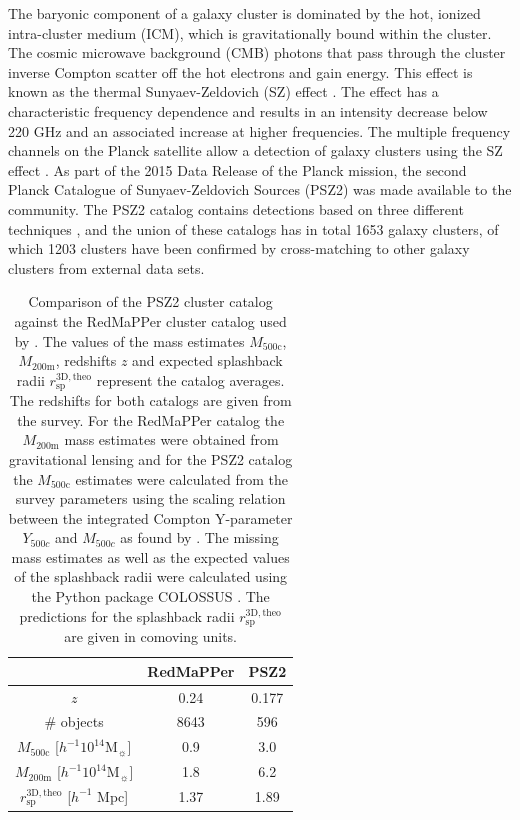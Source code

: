 \documentclass[iop, apjl, twocolappendix, numberedappendix]{emulateapj}
\begin{document}
The baryonic component of a galaxy cluster is dominated by the hot,
ionized  intra-cluster medium (ICM), which is gravitationally bound
within the cluster. The cosmic microwave background (CMB) photons
that pass through the cluster inverse Compton scatter off the hot
electrons and gain energy. This effect is known as the thermal
Sunyaev-Zeldovich (SZ) effect
\citep{sunyaev1970small,sunyaev1980velocity}. The effect has a
characteristic frequency dependence and results in an intensity
decrease below 220 GHz and an associated increase at higher
frequencies. The multiple frequency channels on the Planck satellite
allow a detection of galaxy clusters using the SZ effect
\citep{collaboration2016planck}. As part of the 2015 Data Release of
the Planck mission, the second Planck Catalogue of Sunyaev-Zeldovich
Sources (PSZ2) was made available to the community. The PSZ2 catalog
contains detections based on  three different techniques
\citep{ade2016planck}, and the union of these catalogs has in total
1653 galaxy clusters, of which 1203 clusters have been confirmed by
cross-matching to other galaxy clusters from external data sets.
\begin{table}
    \centering
    \caption{Comparison of the PSZ2 cluster catalog
    against the RedMaPPer cluster catalog used by
\citet{more2016detection}. The values of the mass estimates
$M_{\mathrm{500c}}$, $M_{\mathrm{200m}}$, redshifts $z$ and expected
splashback radii $r^{\mathrm{3D,theo}}_{\mathrm{sp}}$ represent the
catalog averages. The redshifts for both catalogs are given from the
survey. For the RedMaPPer catalog the $M_{\mathrm{200m}}$ mass
estimates were obtained from gravitational lensing and for the PSZ2
catalog the $M_{\mathrm{500c}}$ estimates were calculated from the
survey parameters using the scaling relation between the integrated
Compton Y-parameter $Y_{500c}$ and $M_{500c}$ as found by
\citet{ade2014planck}. The missing mass estimates as well as the
expected values of the splashback radii were calculated using the
Python package COLOSSUS \citep{diemer2017colossus}. The predictions
for the splashback radii $r^{\mathrm{3D,theo}}_{\mathrm{sp}}$ are
given in comoving units.}
    \label{tab:cluster_catalogs}
    \begin{tabular}{ccc}
    \hline
    & RedMaPPer & PSZ2 \\
    \hline
    $z$ & 0.24 & 0.177 \\
    \hline
    \# objects & 8643 & 596\\
    \hline
    $M_{\mathrm{500c}}$ [$h^{-1}10^{14} $M$_{\sun}$] & 0.9 & 3.0 \\
    \hline
    $M_{\mathrm{200m}}$ [$h^{-1}10^{14} $M$_{\sun}$] & 1.8 & 6.2\\
    \hline
    $r^{\mathrm{3D,theo}}_{\mathrm{sp}}$ [$h^{-1}$ Mpc] & 1.37 & 1.89 \\
    \hline
    \end{tabular}
\end{table}
\end{document}
